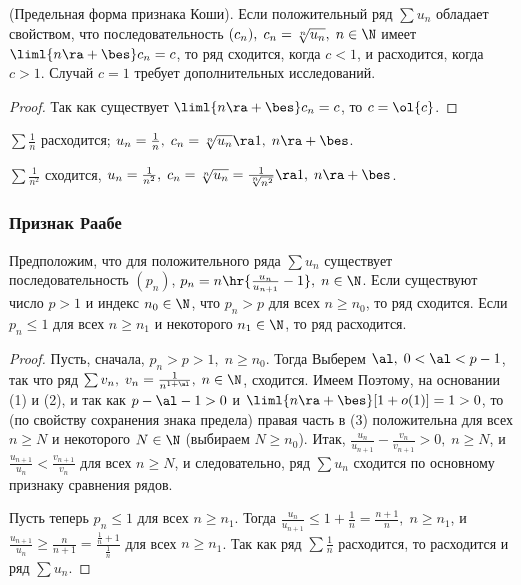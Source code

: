 \documentclass[a4paper]{article}
\begin{document}
\begin{imp}
(Предельная форма признака Коши). Если положительный ряд $\sum u_n$
обладает свойством, что последовательность $(c_n), \;
c_n=\sqrt[n]{u_n}, \; n\in\N$ имеет $\liml{n\ra+\bes}c_n=c$, то ряд
сходится, когда $c<1$, и расходится, когда $c>1$. Случай $c=1$
требует дополнительных исследований.
\end{imp}

\begin{proof}
Так как существует $\liml{n\ra+\bes}c_n=c$, то $c=\ol{c}$.
\end{proof}

\begin{ex}
$\sum\frac1n$ расходится; $u_n=\frac1n, \; c_n=\sqrt[n]{u_n} \ra 1,
\; n\ra+\bes$.
\end{ex}

\begin{ex}
$\sum\frac1{n^2}$ сходится, $u_n=\frac1{n^2}, \;
c_n=\sqrt[n]{u_n}=\frac1{\sqrt[n]{n^2}}\ra1, \; n\ra+\bes$.
\end{ex}

\subsubsection{Признак Раабе}

\begin{theorem}
Предположим, что для положительного ряда $\sum u_n$ существует
последовательность $(p_n)$, $p_n = n\hr{\frac{u_n}{u_{n+1}}-1}, \;
n\in\N$. Если существуют число $p>1$ и индекс $n_0\in\N$, что
$p_n>p$ для всех $n\ge n_0$, то ряд сходится. Если $p_n \le 1$ для
всех $n\ge n_1$ и некоторого $n_1\in\N$, то ряд расходится.
\end{theorem}

\begin{proof}
Пусть, сначала, $p_n>p>1, \; n\ge n_0$. Тогда
 Выберем
$\al, \; 0<\al<p-1$, так что ряд $\sum v_n, \; v_n =
\frac1{n^{1+\al}}, \; n\in\N$, сходится. Имеем
 Поэтому, на основании (1) и (2),
 и так как $p-\al-1>0$ и $\liml{n\ra+\bes}
[1+o(1)]=1>0$, то (по свойству сохранения знака предела) правая
часть в (3) положительна для всех $n\ge N$ и некоторого $N\in\N$
(выбираем $N\ge n_0$). Итак, $\frac{u_n}{u_{n+1}} -
\frac{v_n}{v_{n+1}} > 0, \; n\ge N$, и $\frac{u_{n+1}}{u_n} <
\frac{v_{n+1}}{v_n}$ для всех $n\ge N$, и следовательно, ряд $\sum
u_n$ сходится по основному признаку сравнения рядов.

Пусть теперь $p_n \le1$ для всех $n\ge n_1$. Тогда
$\frac{u_n}{u_{n+1}} \le 1 + \frac1n = \frac{n+1}n, \; n\ge n_1$, и
$\frac{u_{n+1}}{u_n} \ge \frac{n}{n+1} = \frac{\frac1n +
1}{\frac1n}$ для всех $n\ge n_1$. Так как ряд $\sum\frac1n$
расходится, то расходится и ряд $\sum u_n$.
\end{proof}
\end{document}
